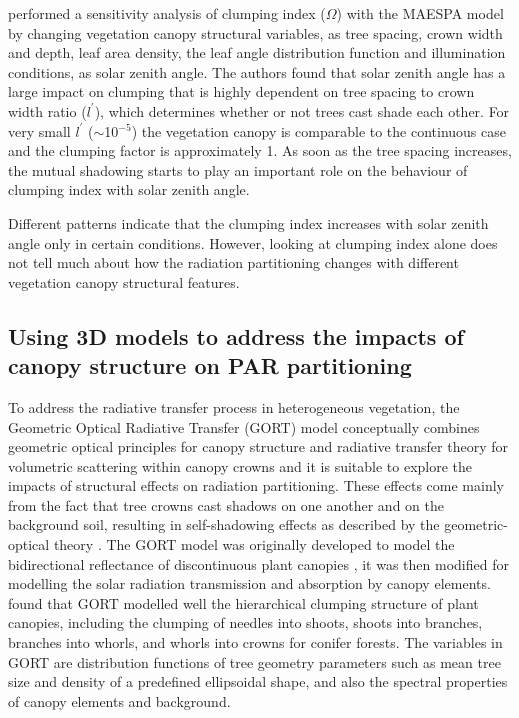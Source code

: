 \documentclass[a4paper,11pt]{report}
\begin{document}
\citet{Chen2008} performed a sensitivity analysis of clumping index ($\Omega$) \citep{Nilson1971,chen1992} with the MAESPA model \citep{Duursma2012} by changing vegetation canopy structural variables, as tree spacing, crown width and depth, leaf area density, the leaf angle distribution function and illumination conditions, as solar zenith angle. The authors found that solar zenith angle has a large impact on clumping that is highly dependent on tree spacing to crown width ratio ($l^{\prime}$), which determines whether or not trees cast shade each other. For very small $l^{\prime}$ ($\sim$10$^{-5}$) the vegetation canopy is comparable to the continuous case and the clumping factor is approximately 1. As soon as the tree spacing increases, the mutual shadowing starts to play an important role on the behaviour of clumping index with solar zenith angle. 

Different patterns indicate that the clumping index increases with solar zenith angle only in certain conditions. However, looking at clumping index alone does not tell much about how the radiation partitioning changes with different vegetation canopy structural features.

\subsection{Using 3D models to address the impacts of canopy structure on PAR partitioning}
To address the radiative transfer process in heterogeneous vegetation, the Geometric Optical Radiative Transfer (GORT) model conceptually combines geometric optical principles for canopy structure and radiative transfer theory for volumetric scattering within canopy crowns \citep{Li1995} and it is suitable to explore the impacts of structural effects on radiation partitioning. These effects come mainly from the fact that tree crowns cast shadows on one another and on the background soil, resulting in self-shadowing effects as described by the geometric-optical theory \citep{Li1992}. The GORT model was originally developed to model the bidirectional reflectance of discontinuous plant canopies \citep{Li1995}, it was then modified for modelling the solar radiation transmission and absorption by canopy elements. \citet{Ni1997} found that GORT modelled well the hierarchical clumping structure of plant canopies, including the clumping of needles into shoots, shoots into branches, branches into whorls, and whorls into crowns for conifer forests. The variables in GORT are distribution functions of tree geometry parameters such as mean tree size and density of a predefined ellipsoidal shape, and also the spectral properties of canopy elements and background. 
\end{document}
